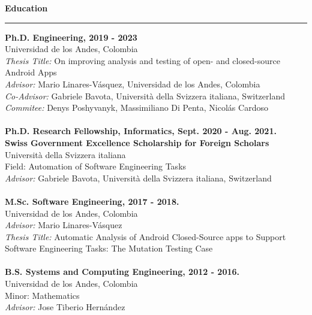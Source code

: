 \documentclass[letterpaper,11pt,oneside]{article}
\begin{document}
\noindent \Large{\textbf{Education}} \\
\vspace{-2ex}
\hrule 
\normalsize
\vspace{2ex}
\noindent \textbf{Ph.D. Engineering, 2019 - 2023} \\
	Universidad de los Andes, Colombia \\
	{\small \textit{Thesis Title:} On improving analysis and testing of open- and closed-source Android Apps \\}
	\textit{Advisor:} Mario Linares-V\'{a}squez, Universidad de los Andes, Colombia \\
	\textit{Co-Advisor:} Gabriele Bavota, Università della Svizzera italiana, Switzerland \\
	\textit{Commitee:} Denys Poshyvanyk, Massimiliano Di Penta, Nicol\'as Cardoso\\
	\\
\textbf{Ph.D. Research Fellowship, Informatics, Sept. 2020 - Aug. 2021.} \\
	\textbf{Swiss Government Excellence Scholarship for Foreign Scholars} \\
	Università della Svizzera italiana \\
	Field: Automation of Software Engineering Tasks \\
	\textit{Advisor:} Gabriele Bavota, Università della Svizzera italiana, Switzerland \\
	\\
\textbf{M.Sc. Software Engineering, 2017 - 2018.} \\
	Universidad de los Andes, Colombia  \\
	\textit{Advisor:} Mario Linares-V\'{a}squez \\
	{\small \textit{Thesis Title:} Automatic Analysis of Android Closed-Source apps to Support Software Engineering Tasks: The Mutation Testing Case \\}
	\\
\textbf{B.S. Systems and Computing Engineering, 2012 - 2016.} \\
	Universidad de los Andes, Colombia  \\
	Minor: Mathematics \\
	\textit{Advisor:} Jose Tiberio Hern\'{a}ndez \\
	
\end{document}
